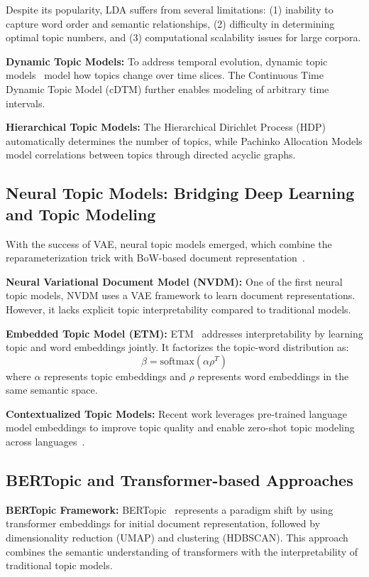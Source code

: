 Despite its popularity, LDA suffers from several limitations: (1) inability to capture word order and semantic relationships, (2) difficulty in determining optimal topic numbers, and (3) computational scalability issues for large corpora.

\textbf{Dynamic Topic Models:} To address temporal evolution, dynamic topic models~\cite{blei2006dynamic} model how topics change over time slices. The Continuous Time Dynamic Topic Model (cDTM) further enables modeling of arbitrary time intervals.

\textbf{Hierarchical Topic Models:} The Hierarchical Dirichlet Process (HDP) automatically determines the number of topics, while Pachinko Allocation Models model correlations between topics through directed acyclic graphs.

\subsection{Neural Topic Models: Bridging Deep Learning and Topic Modeling}

With the success of VAE, neural topic models emerged, which combine the reparameterization trick with BoW-based document representation~\cite{srivastava2017autoencoding}.

\textbf{Neural Variational Document Model (NVDM):} One of the first neural topic models, NVDM uses a VAE framework to learn document representations. However, it lacks explicit topic interpretability compared to traditional models.

\textbf{Embedded Topic Model (ETM):} ETM~\cite{dieng2020topic} addresses interpretability by learning topic and word embeddings jointly. It factorizes the topic-word distribution as:
$$\beta = \text{softmax}(\alpha \rho^T)$$
where $\alpha$ represents topic embeddings and $\rho$ represents word embeddings in the same semantic space.

\textbf{Contextualized Topic Models:} Recent work leverages pre-trained language model embeddings to improve topic quality and enable zero-shot topic modeling across languages~\cite{wu2024fastopic}.

\subsection{BERTopic and Transformer-based Approaches}

\textbf{BERTopic Framework:} BERTopic~\cite{grootendorst2022bertopic} represents a paradigm shift by using transformer embeddings for initial document representation, followed by dimensionality reduction (UMAP) and clustering (HDBSCAN). This approach combines the semantic understanding of transformers with the interpretability of traditional topic models.

